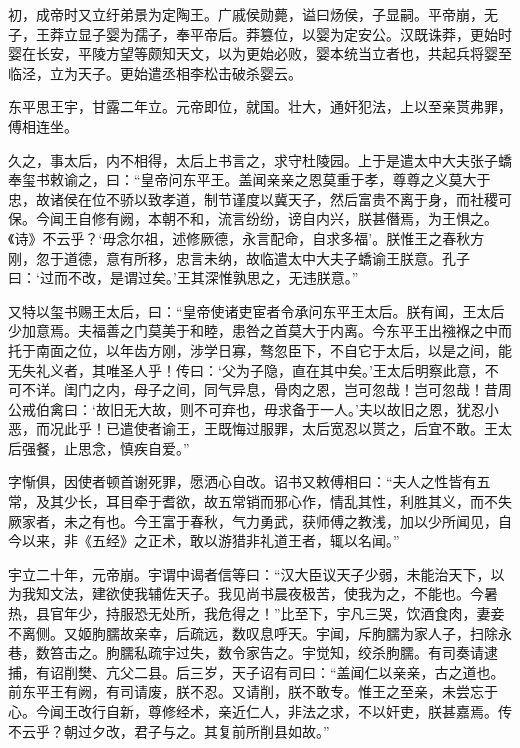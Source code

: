 \documentclass[12pt,UTF8]{ctexbook}
\begin{document}
初，成帝时又立纡弟景为定陶王。广戚侯勋薨，谥曰炀侯，子显嗣。平帝崩，无子，王莽立显子婴为孺子，奉平帝后。莽篡位，以婴为定安公。汉既诛莽，更始时婴在长安，平陵方望等颇知天文，以为更始必败，婴本统当立者也，共起兵将婴至临泾，立为天子。更始遣丞相李松击破杀婴云。



东平思王宇，甘露二年立。元帝即位，就国。壮大，通奸犯法，上以至亲贳弗罪，傅相连坐。



久之，事太后，内不相得，太后上书言之，求守杜陵园。上于是遣太中大夫张子蟜奉玺书敕谕之，曰：“皇帝问东平王。盖闻亲亲之恩莫重于孝，尊尊之义莫大于忠，故诸侯在位不骄以致孝道，制节谨度以冀天子，然后富贵不离于身，而社稷可保。今闻王自修有阙，本朝不和，流言纷纷，谤自内兴，朕甚僭焉，为王惧之。《诗》不云乎？‘毋念尔祖，述修厥德，永言配命，自求多福’。朕惟王之春秋方刚，忽于道德，意有所移，忠言未纳，故临遣太中大夫子蟜谕王朕意。孔子曰：‘过而不改，是谓过矣。’王其深惟孰思之，无违朕意。”



又特以玺书赐王太后，曰：“皇帝使诸吏宦者令承问东平王太后。朕有闻，王太后少加意焉。夫福善之门莫美于和睦，患咎之首莫大于内离。今东平王出襁褓之中而托于南面之位，以年齿方刚，涉学日寡，骜忽臣下，不自它于太后，以是之间，能无失礼义者，其唯圣人乎！传曰：‘父为子隐，直在其中矣。’王太后明察此意，不可不详。闺门之内，母子之间，同气异息，骨肉之恩，岂可忽哉！岂可忽哉！昔周公戒伯禽曰：‘故旧无大故，则不可弃也，毋求备于一人。’夫以故旧之恩，犹忍小恶，而况此乎！已遣使者谕王，王既悔过服罪，太后宽忍以贳之，后宜不敢。王太后强餐，止思念，慎疾自爱。”



字惭俱，因使者顿首谢死罪，愿洒心自改。诏书又敕傅相曰：“夫人之性皆有五常，及其少长，耳目牵于耆欲，故五常销而邪心作，情乱其性，利胜其义，而不失厥家者，未之有也。今王富于春秋，气力勇武，获师傅之教浅，加以少所闻见，自今以来，非《五经》之正术，敢以游猎非礼道王者，辄以名闻。”



宇立二十年，元帝崩。宇谓中谒者信等曰：“汉大臣议天子少弱，未能治天下，以为我知文法，建欲使我辅佐天子。我见尚书晨夜极苦，使我为之，不能也。今暑热，县官年少，持服恐无处所，我危得之！”比至下，宇凡三哭，饮酒食肉，妻妾不离侧。又姬朐臑故亲幸，后疏远，数叹息呼天。宇闻，斥朐臑为家人子，扫除永巷，数笞击之。朐臑私疏宇过失，数令家告之。宇觉知，绞杀朐臑。有司奏请逮捕，有诏削樊、亢父二县。后三岁，天子诏有司曰：“盖闻仁以亲亲，古之道也。前东平王有阙，有司请废，朕不忍。又请削，朕不敢专。惟王之至亲，未尝忘于心。今闻王改行自新，尊修经术，亲近仁人，非法之求，不以奸吏，朕甚嘉焉。传不云乎？朝过夕改，君子与之。其复前所削县如故。”
\end{document}
